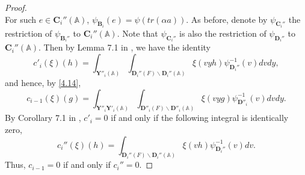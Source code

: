 \documentclass[12pts]{amsart}
\newcommand{\BA}{{\mathbb {A}}}
\begin{document}
\begin{proof}
$$	$$
	For such $e\in \mathbf{C}_i''(\BA)$,
	$\psi_{\mathbf{B}_i}(e)=\psi(tr(\alpha a))$. As before, denote by
	$\psi_{\mathbf{C}_i''}$ the restriction of $\psi_{\mathbf{B}_i''}$ to
	$\mathbf{C}_i''(\BA)$. Note that $\psi_{\mathbf{C}_i''}$ is also the
	restriction of $\psi_{\mathbf{D}_i''}$ to $\mathbf{C}_i''(\BA)$. Then
	by Lemma 7.1 in \cite{GRS11}, we have the identity
	\begin{equation}\label{4.18}
	c'_i(\xi)(h)=\int_{\mathbf{Y}''_i(\BA)}\int_{\mathbf{D}_i''(F)\backslash \mathbf{D}_i''(\BA)}\xi(vyh)\psi_{\mathbf{D}_i''}^{-1}(v)dvdy,
	\end{equation}
	and hence, by \eqref{4.14},
	\begin{equation}\label{4.19}
	c_{i-1}(\xi)(g)=\int_{\mathbf{Y}''_i\mathbf{Y}'_i(\BA)}\int_{\mathbf{D}''_i(F)\backslash \mathbf{D}''_i(\BA)}\xi(vyg)\psi_{\mathbf{D}''_i}^{-1}(v)dvdy.
\end{equation}
	By Corollary 7.1 in \cite{GRS11},
	$c'_i=0$ if and only if the following integral is identically zero,
	$$
	c_i''(\xi)(h)=\int_{\mathbf{D}_i''(F)\backslash \mathbf{D}_i''(\BA)}\xi(vh)\psi_{\mathbf{D}_i''}^{-1}(v)dv.
	$$ 
	Thus, $c_{i-1}=0$ if and only if $c_i''=0$.
	 

\end{proof}
\end{document}
